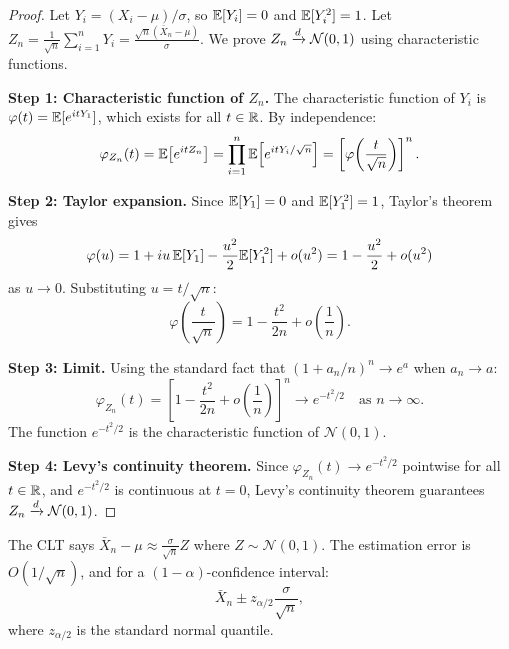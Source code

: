 \documentclass[11pt,a4paper]{article}
\begin{document}
\begin{proof}
Let $Y_i = (X_i - \mu)/\sigma$, so $\mathbb{E}[Y_i] = 0$ and
$\mathbb{E}[Y_i^2] = 1$.  Let $Z_n = \frac{1}{\sqrt{n}}\sum_{i=1}^n
Y_i = \frac{\sqrt{n}(\bar{X}_n - \mu)}{\sigma}$.  We prove
$Z_n \xrightarrow{d} \mathcal{N}(0,1)$ using characteristic functions.

\textbf{Step 1: Characteristic function of $Z_n$.}
The characteristic function of $Y_i$ is
$\varphi(t) = \mathbb{E}[e^{itY_1}]$, which exists for all $t \in \mathbb{R}$.
By independence:
\begin{equation}
  \varphi_{Z_n}(t)
  = \mathbb{E}\!\left[e^{it Z_n}\right]
  = \prod_{i=1}^n \mathbb{E}\!\left[e^{it Y_i/\sqrt{n}}\right]
  = \left[\varphi\!\left(\frac{t}{\sqrt{n}}\right)\right]^n.
\end{equation}

\textbf{Step 2: Taylor expansion.}
Since $\mathbb{E}[Y_1] = 0$ and $\mathbb{E}[Y_1^2] = 1$, Taylor's theorem gives
\begin{equation}
  \varphi(u)
  = 1 + iu\,\mathbb{E}[Y_1] - \frac{u^2}{2}\mathbb{E}[Y_1^2] + o(u^2)
  = 1 - \frac{u^2}{2} + o(u^2)
\end{equation}
as $u \to 0$.  Substituting $u = t/\sqrt{n}$:
\begin{equation}
  \varphi\!\left(\frac{t}{\sqrt{n}}\right)
  = 1 - \frac{t^2}{2n} + o\!\left(\frac{1}{n}\right).
\end{equation}

\textbf{Step 3: Limit.}
Using the standard fact that
$(1 + a_n/n)^n \to e^a$ when $a_n \to a$:
\begin{equation}
  \varphi_{Z_n}(t)
  = \left[1 - \frac{t^2}{2n}
    + o\!\left(\frac{1}{n}\right)\right]^n
  \to e^{-t^2/2}
  \quad \text{as } n \to \infty.
\end{equation}
The function $e^{-t^2/2}$ is the characteristic function of
$\mathcal{N}(0,1)$.

\textbf{Step 4: Levy's continuity theorem.}
Since $\varphi_{Z_n}(t) \to e^{-t^2/2}$ pointwise for all
$t \in \mathbb{R}$, and $e^{-t^2/2}$ is continuous at $t = 0$,
Levy's continuity theorem guarantees
$Z_n \xrightarrow{d} \mathcal{N}(0,1)$.
\end{proof}

\begin{remark}
\label{rem:clt_rate}
The CLT says $\bar{X}_n - \mu \approx
\frac{\sigma}{\sqrt{n}} Z$ where $Z \sim \mathcal{N}(0,1)$.
The estimation error is $O(1/\sqrt{n})$, and for a
$(1-\alpha)$-confidence interval:
\begin{equation}
  \bar{X}_n \pm z_{\alpha/2} \frac{\sigma}{\sqrt{n}},
\end{equation}
where $z_{\alpha/2}$ is the standard normal quantile.
\end{remark}
\end{document}
